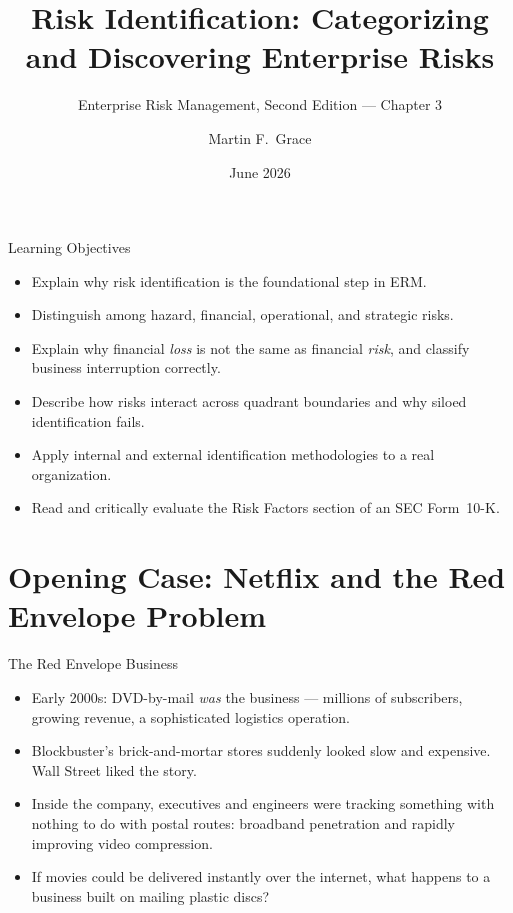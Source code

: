 \documentclass[11pt, aspectratio=169]{beamer}
\title[ERM Ch.\,3]{Risk Identification: Categorizing and Discovering Enterprise Risks}
\subtitle{Enterprise Risk Management, Second Edition --- Chapter 3}
\author{Martin F.\ Grace}
\institute{University of Iowa\\[2pt] Tippie College of Business\\[2pt] Vaughan Institute of Risk Management}
\date{June 2026}
\begin{document}
\begin{frame}[plain]
\titlepage
\end{frame}

\begin{frame}{Learning Objectives}
\begin{itemize}
  \item Explain why \alert{risk identification} is the foundational step in ERM.
  \item Distinguish among hazard, financial, operational, and strategic risks.
  \item Explain why financial \emph{loss} is not the same as financial \emph{risk}, and classify business interruption correctly.
  \item Describe how risks interact across quadrant boundaries and why siloed identification fails.
  \item Apply internal and external identification methodologies to a real organization.
  \item Read and critically evaluate the \alert{Risk Factors} section of an SEC Form~10-K.
\end{itemize}
\end{frame}

\section{Opening Case: Netflix and the Red Envelope Problem}

\begin{frame}{The Red Envelope Business}
\begin{itemize}
  \item Early 2000s: DVD-by-mail \emph{was} the business --- millions of subscribers, growing revenue, a sophisticated logistics operation.
  \item Blockbuster's brick-and-mortar stores suddenly looked slow and expensive. Wall Street liked the story.
  \item Inside the company, executives and engineers were tracking something with nothing to do with postal routes: \alert{broadband penetration} and rapidly improving video compression.
  \item If movies could be delivered instantly over the internet, what happens to a business built on mailing plastic discs?
\end{itemize}
\end{frame}
\end{document}
